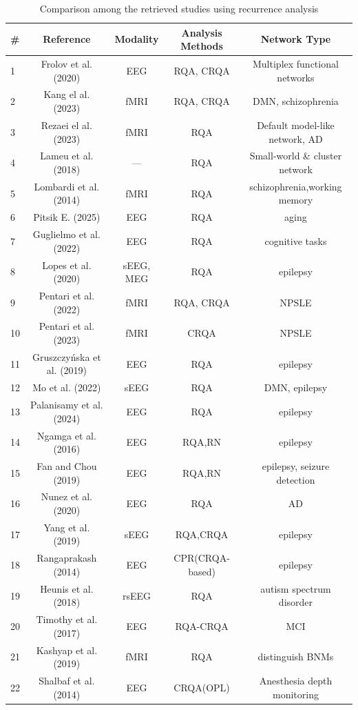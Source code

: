 \documentclass{article}
\begin{document}
		\begin{table}[h]
		\centering
		\caption{Comparison among the retrieved studies using recurrence analysis}
		\label{tab:comparison}
		\begin{tabular}{@{}lcccc@{}}
		\toprule
		\# & Reference & Modality & Analysis Methods & Network Type \\
		\midrule

		1  & Frolov et al. (2020) & EEG & RQA, CRQA & Multiplex functional networks \\
		2  & Kang el al. (2023) & fMRI & RQA, CRQA & DMN, schizophrenia \\
		3  & Rezaei el al. (2023) & fMRI & RQA & Default model-like network, AD \\
		4  & Lameu et al. (2018) & --- & RQA & Small-world \& cluster network \\
		5  & Lombardi et al. (2014) & fMRI & RQA & schizophrenia,working memory \\
		6  & Pitsik E. (2025) & EEG & RQA & aging \\
		7  & Guglielmo et al. (2022) & EEG & RQA & cognitive tasks \\
		8  & Lopes et al. (2020) & sEEG, MEG & RQA & epilepsy \\
		9  & Pentari et al. (2022) & fMRI & RQA, CRQA & NPSLE \\
		10 & Pentari et al. (2023) & fMRI & CRQA & NPSLE  \\
		11 & Gruszczyńska et al. (2019) & EEG & RQA & epilepsy \\
		12 & Mo et al. (2022) & sEEG & RQA & DMN, epilepsy \\
		13 & Palanisamy et al. (2024) & EEG & RQA & epilepsy \\
		14 & Ngamga et al. (2016) & EEG & RQA,RN & epilepsy \\
		15 & Fan and Chou (2019) & EEG & RQA,RN & epilepsy, seizure detection \\
		16 & Nunez et al. (2020) & EEG & RQA & AD \\
		17 & Yang et al. (2019) & sEEG & RQA,CRQA & epilepsy \\
		18 & Rangaprakash (2014) & EEG & CPR(CRQA-based) & epilepsy \\
		19 & Heunis et al. (2018) & rsEEG & RQA & autism spectrum disorder \\
		20 & Timothy et al. (2017) & EEG & RQA-CRQA & MCI \\
		21 & Kashyap et al. (2019) & fMRI & RQA & distinguish BNMs \\
		22 & Shalbaf et al. (2014) & EEG & CRQA(OPL) &  Anesthesia depth monitoring\\

		\bottomrule
		\end{tabular}
		\end{table}
\end{document}
